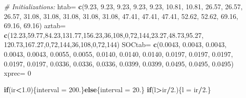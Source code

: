 \documentclass[
]{book}
\newenvironment{Shaded}{\begin{snugshade}}{\end{snugshade}}
\newcommand{\CommentTok}[1]{\textcolor[rgb]{0.56,0.35,0.01}{\textit{#1}}}
\newcommand{\ControlFlowTok}[1]{\textcolor[rgb]{0.13,0.29,0.53}{\textbf{#1}}}
\newcommand{\DecValTok}[1]{\textcolor[rgb]{0.00,0.00,0.81}{#1}}
\newcommand{\FloatTok}[1]{\textcolor[rgb]{0.00,0.00,0.81}{#1}}
\newcommand{\KeywordTok}[1]{\textcolor[rgb]{0.13,0.29,0.53}{\textbf{#1}}}
\newcommand{\NormalTok}[1]{#1}
\newcommand{\OperatorTok}[1]{\textcolor[rgb]{0.81,0.36,0.00}{\textbf{#1}}}
\newcommand{\StringTok}[1]{\textcolor[rgb]{0.31,0.60,0.02}{#1}}
\begin{document}
\begin{Shaded}
\begin{Highlighting}[]
\CommentTok{# Initializations:}
\NormalTok{htab=}\StringTok{ }\KeywordTok{c}\NormalTok{(}\FloatTok{9.23}\NormalTok{, }\FloatTok{9.23}\NormalTok{, }\FloatTok{9.23}\NormalTok{, }\FloatTok{9.23}\NormalTok{, }\FloatTok{9.23}\NormalTok{, }\FloatTok{10.81}\NormalTok{, }\FloatTok{10.81}\NormalTok{, }\FloatTok{26.57}\NormalTok{,}
        \FloatTok{26.57}\NormalTok{, }\FloatTok{26.57}\NormalTok{, }\FloatTok{31.08}\NormalTok{, }\FloatTok{31.08}\NormalTok{, }\FloatTok{31.08}\NormalTok{, }\FloatTok{31.08}\NormalTok{, }\FloatTok{31.08}\NormalTok{, }\FloatTok{47.41}\NormalTok{,}
        \FloatTok{47.41}\NormalTok{, }\FloatTok{47.41}\NormalTok{, }\FloatTok{52.62}\NormalTok{, }\FloatTok{52.62}\NormalTok{, }\FloatTok{69.16}\NormalTok{, }\FloatTok{69.16}\NormalTok{, }\FloatTok{69.16}\NormalTok{)}
\NormalTok{aztab=}\StringTok{ }\KeywordTok{c}\NormalTok{(}\FloatTok{12.23}\NormalTok{,}\FloatTok{59.77}\NormalTok{,}\FloatTok{84.23}\NormalTok{,}\FloatTok{131.77}\NormalTok{,}\FloatTok{156.23}\NormalTok{,}\DecValTok{36}\NormalTok{,}\DecValTok{108}\NormalTok{,}\DecValTok{0}\NormalTok{,}\DecValTok{72}\NormalTok{,}\DecValTok{144}\NormalTok{,}\FloatTok{23.27}\NormalTok{,}\FloatTok{48.73}\NormalTok{,}\FloatTok{95.27}\NormalTok{,}
         \FloatTok{120.73}\NormalTok{,}\FloatTok{167.27}\NormalTok{,}\DecValTok{0}\NormalTok{,}\DecValTok{72}\NormalTok{,}\DecValTok{144}\NormalTok{,}\DecValTok{36}\NormalTok{,}\DecValTok{108}\NormalTok{,}\DecValTok{0}\NormalTok{,}\DecValTok{72}\NormalTok{,}\DecValTok{144}\NormalTok{)}
\NormalTok{SOCtab=}\StringTok{ }\KeywordTok{c}\NormalTok{(}\FloatTok{0.0043}\NormalTok{, }\FloatTok{0.0043}\NormalTok{, }\FloatTok{0.0043}\NormalTok{, }\FloatTok{0.0043}\NormalTok{, }\FloatTok{0.0043}\NormalTok{, }\FloatTok{0.0055}\NormalTok{,}
          \FloatTok{0.0055}\NormalTok{, }\FloatTok{0.0140}\NormalTok{, }\FloatTok{0.0140}\NormalTok{, }\FloatTok{0.0140}\NormalTok{, }\FloatTok{0.0197}\NormalTok{, }\FloatTok{0.0197}\NormalTok{,}
          \FloatTok{0.0197}\NormalTok{, }\FloatTok{0.0197}\NormalTok{, }\FloatTok{0.0197}\NormalTok{, }\FloatTok{0.0336}\NormalTok{, }\FloatTok{0.0336}\NormalTok{, }\FloatTok{0.0336}\NormalTok{,}
          \FloatTok{0.0399}\NormalTok{, }\FloatTok{0.0399}\NormalTok{, }\FloatTok{0.0495}\NormalTok{, }\FloatTok{0.0495}\NormalTok{, }\FloatTok{0.0495}\NormalTok{)}
\NormalTok{xprec=}\StringTok{ }\DecValTok{0}

\ControlFlowTok{if}\NormalTok{(ir}\OperatorTok{<}\FloatTok{1.0}\NormalTok{)\{interval =}\StringTok{ }\FloatTok{200.}\NormalTok{\}}\ControlFlowTok{else}\NormalTok{\{interval =}\StringTok{ }\FloatTok{20.}\NormalTok{\}}
\ControlFlowTok{if}\NormalTok{(l}\OperatorTok{>}\NormalTok{ir}\OperatorTok{/}\FloatTok{2.}\NormalTok{)\{l =}\StringTok{ }\NormalTok{ir}\OperatorTok{/}\FloatTok{2.}\NormalTok{\}}


\end{Highlighting}
\end{Shaded}
\end{document}
